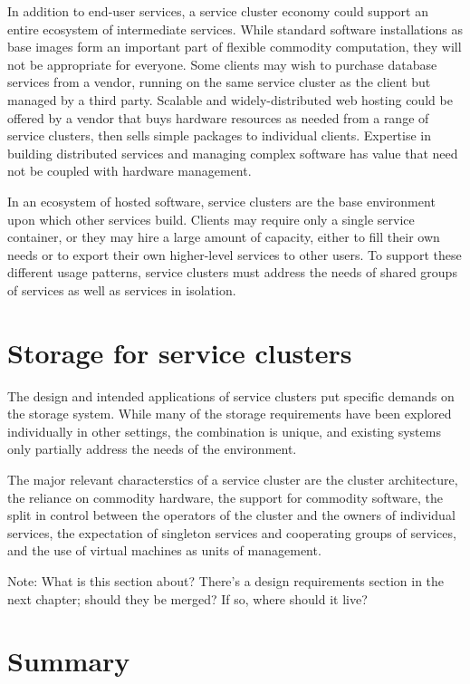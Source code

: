In addition to end-user services, a service cluster economy could support an entire ecosystem of intermediate services. While standard software installations as base images form an important part of flexible commodity computation, they will not be appropriate for everyone. Some clients may wish to purchase database services from a vendor, running on the same service cluster as the client but managed by a third party. Scalable and widely-distributed web hosting could be offered by a vendor that buys hardware resources as needed from a range of service clusters, then sells simple packages to individual clients. Expertise in building distributed services and managing complex software has value that need not be coupled with hardware management.

In an ecosystem of hosted software, service clusters are the base environment upon which other services build. Clients may require only a single service container, or they may hire a large amount of capacity, either to fill their own needs or to export their own higher-level services to other users. To support these different usage patterns, service clusters must address the needs of shared groups of services as well as services in isolation.

\section{Storage for service clusters}

The design and intended applications of service clusters put specific demands on the storage system. While many of the storage requirements have been explored individually in other settings, the combination is unique, and existing systems only partially address the needs of the environment.

The major relevant characterstics of a service cluster are the cluster architecture, the reliance on commodity hardware, the support for commodity software, the split in control between the operators of the cluster and the owners of individual services, the expectation of singleton services and cooperating groups of services, and the use of virtual machines as units of management.

Note: What is this section about? There's a design requirements section in the next chapter; should they be merged? If so, where should it live?

\section{Summary}

